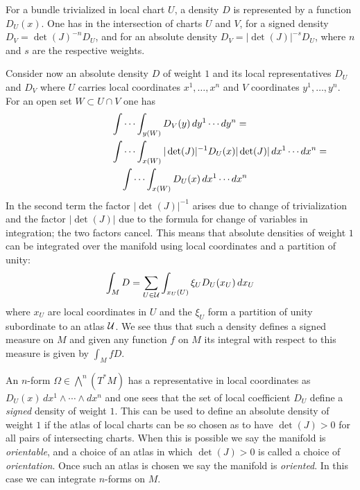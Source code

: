 \documentclass[12pt,titlepage]{article}
\def\cU{{\cal U}}
\begin{document}
For a bundle
trivialized in local chart \(U\), a density \(D\) is represented by
a function \(D_U(x)\). One has in the intersection of charts \(U\)
and \(V\), for a signed density \(D_V =\det (J)^{-n}D_U\),
and for an absolute  density \(D_V =|\det (J)|^{-s}D_U\),
where  \(n\) and \(s\) are the respective weights. 

Consider now an absolute density \(D\) of weight \(1\) and its local
representatives \(D_U\) and \(D_V\) where \(U\) carries local
coordinates \(x^1,\dots,x^n\) and \(V\) coordinates \(y^1,\dots,y^n\).
For an open set \(W\subset U\cap V\) one has
\begin{eqnarray*}\lefteqn{\int\cdots\int_{y(W)} D_V(y)\, dy^1\cdots dy^n =} & & \\
\lefteqn{\int\cdots \int_{x(W)}
|\det(J)|^{-1}D_U(x)|\det (J)|\,dx^1\cdots dx^n =}& & \\
 & & \int\cdots\int_{x(W)}D_U(x)\,dx^1\cdots dx^n
\end{eqnarray*}
In the second term the factor \(|\det(J)|^{-1}\) arises due to change of
trivialization and the factor \(|\det (J)|\) due to the formula
for change of variables in integration; the two factors cancel.
This means that absolute densities of weight \(1\) can be integrated
over the manifold using local coordinates and a partition of unity:
\[
\int_M D = \sum_{U\in \cU}\int_{x_U(U)} \xi_U  D_U(x_U)\,dx_U
\]
where  \(x_U\) are local coordinates in \(U\) and the \(\xi_U\) form a
partition of unity subordinate to an atlas \(\cU\). We see thus that such a 
density defines a signed measure on \(M\) and given any function \(f\) on 
\(M\) its integral with respect to this measure is given by \(\int_M fD\).


An \(n\)-form \(\Omega\in \bigwedge^n(T^*M)\) has a representative in local
coordinates as \(D_U(x)\, dx^1\wedge\cdots\wedge dx^n\) and one sees that
the set of local coefficient \(D_U\) define a {\em signed\/}
density of weight \(1\).
This can be used to define
 an absolute density of weight \(1\) if the atlas of local
charts can be so chosen as to have \(\det (J) > 0\) for all pairs
of intersecting charts. When this is possible we say the manifold is
{\em orientable\/}, 
%
and a choice of an atlas in which \(\det (J)
> 0\) is called a choice of {\em orientation\/}.
%
 Once such an atlas is
chosen we say the manifold is {\em oriented\/}.
%
In this case we can integrate \(n\)-forms on \(M\).
\end{document}
